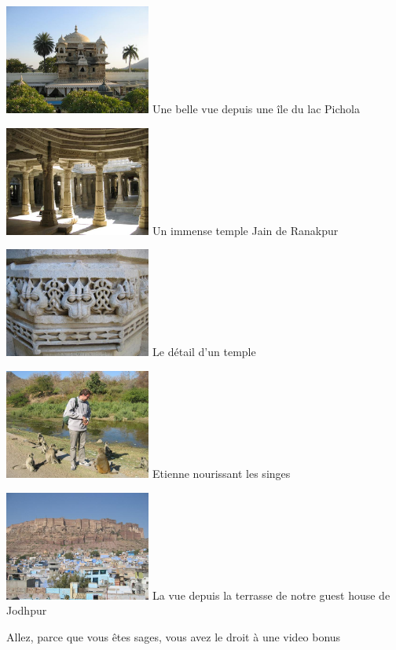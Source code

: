 \begin{multicols}{2}
\hspace*{-0.65cm}
\includegraphics[width=4.8cm]{articles/Il-commence-a-faire-chaud/picchola.jpg}
Une belle vue depuis une île du lac Pichola

\hspace*{-0.65cm}
\includegraphics[width=4.8cm]{articles/Il-commence-a-faire-chaud/ranak.jpg}
Un immense temple Jain de Ranakpur

\hspace*{-0.65cm}
\includegraphics[width=4.8cm]{articles/Il-commence-a-faire-chaud/ranak2.jpg}
Le détail d'un temple

\hspace*{-0.65cm}
\includegraphics[width=4.8cm]{articles/Il-commence-a-faire-chaud/ranak3.jpg}
Etienne nourissant les singes

\hspace*{-0.65cm}
\includegraphics[width=4.8cm]{articles/Il-commence-a-faire-chaud/ranak4.jpg}
La vue depuis la terrasse de notre guest house de Jodhpur

Allez, parce que vous êtes sages, vous avez le droit à une video bonus

\end{multicols}


